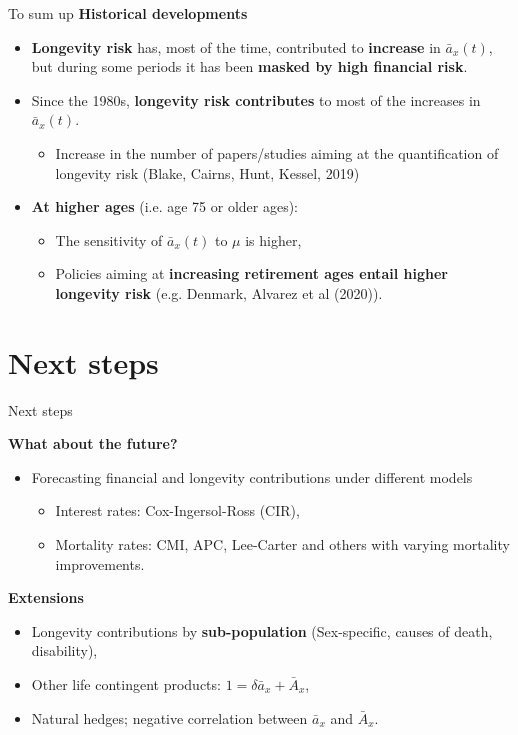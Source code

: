 \documentclass[10pt]{beamer}
\begin{document}
\begin{frame}{To sum up}
\textbf{Historical developments}
\begin{itemize}
	\item \textbf{Longevity risk} has, most of the time, contributed to \textbf{increase} in $\bar{a}_x(t)$, but during some periods it has been \textbf{masked by high financial risk}. \pause
	\item Since the 1980s, \textbf{longevity risk contributes} to most of the increases in $\bar{a}_x(t)$. \pause
	\begin{itemize}
		\item Increase in the number of papers/studies aiming at the quantification of longevity risk {\scriptsize (Blake, Cairns, Hunt, Kessel, 2019)} \pause
	\end{itemize}
	\item \textbf{At higher ages} (i.e. age 75 or older ages): \pause
	\begin{itemize}
		\item The sensitivity of $\bar{a}_x(t)$ to $\mu$ is higher, \pause
		\item Policies aiming at \textbf{increasing retirement ages entail higher longevity risk} (e.g. Denmark, Alvarez et al (2020)).
\end{itemize}
\end{itemize}
\end{frame}

\section{Next steps}

\begin{frame}{Next steps}

\textbf{What about the future?}

\begin{itemize}
	\item Forecasting financial and longevity contributions under different models \pause
	\begin{itemize}
		\item Interest rates: Cox-Ingersol-Ross (CIR), \pause
		\item Mortality rates: CMI, APC, Lee-Carter and others with varying mortality improvements. \pause
	\end{itemize} 
\end{itemize}


\textbf{Extensions} \pause
\begin{itemize}
	\item Longevity contributions by \textbf{sub-population} (Sex-specific, causes of death, disability), \pause
	\item Other life contingent products: $1=\delta \bar{a}_x + \bar{A}_x$, \pause
	\item Natural hedges; negative correlation between $\bar{a}_x$ and $\bar{A}_x$. 
\end{itemize}


\end{frame}
\end{document}
